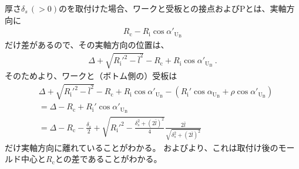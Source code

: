 \clearpage
\index{\yomiSpacerThickness@\nameSpacerThickness}厚さ$\delta_s\,(>0)$の\Spacer を取付けた場合、ワークと受板との接点および\TableCenter Pとは、実軸方向に
\begin{align*}
  R_\mathrm c-R_\mathrm i\cos\alpha'_{\mathrm U_\mathrm B}
\end{align*}
だけ差があるので、その実軸方向の位置は、
\begin{align*}
  \Delta+\sqrt{R_\mathrm i'^2-\bar l^2}-R_\mathrm c+R_\mathrm i\cos\alpha'_{\mathrm U_\mathrm B}\ .
\end{align*}
そのためより、ワークと（ボトム側の）受板は
\begin{align*}
  &  \Delta+\sqrt{R_\mathrm i'^2-\bar l^2}-R_\mathrm c+R_\mathrm i\cos\alpha'_{\mathrm U_\mathrm B}
     -\left(R_\mathrm i'\cos\alpha_{\mathrm U_\mathrm B}+\rho\cos\alpha'_{\mathrm U_\mathrm B}\right)\\
  &= \Delta-R_\mathrm c+R_\mathrm i'\cos\alpha'_{\mathrm U_\mathrm B}\\
  &= \Delta-R_\mathrm c
     -\frac{\delta_s}2+\sqrt{R_\mathrm i'^2-\frac{\delta_s^2+(2\bar l)^2}4}\frac{2\bar l}{\sqrt{\delta_s^2+(2\bar l)^2}}
\end{align*}
だけ実軸方向に離れていることがわかる。
およびより、これは\Spacer 取付け後のモールド中心と\CenterCurvature$R_\mathrm c$との差であることがわかる。
